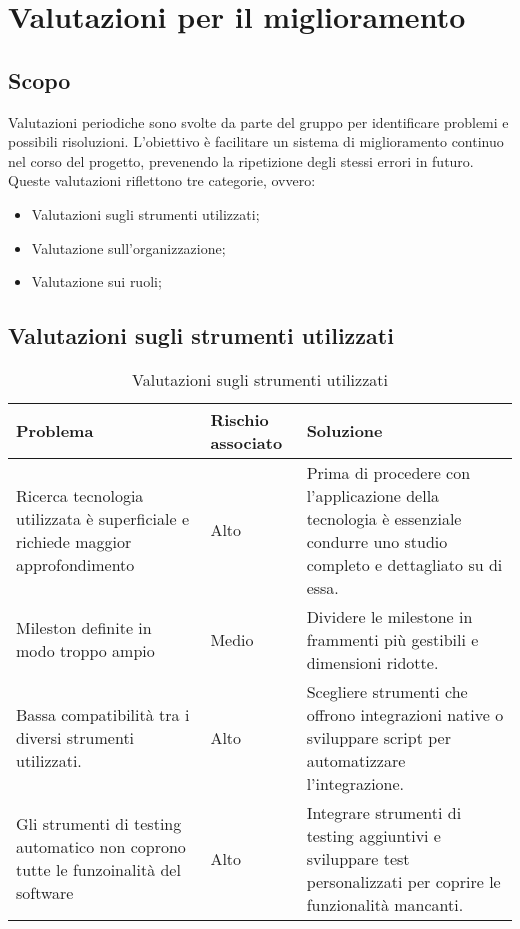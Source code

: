 

\section{Valutazioni per il miglioramento}
\label{sec:Valutazioni per il miglioramento}


\subsection{Scopo}
Valutazioni periodiche sono svolte da parte del gruppo per identificare problemi e possibili
risoluzioni. L’obiettivo è facilitare un sistema di miglioramento continuo nel corso del progetto, 
prevenendo la ripetizione degli stessi errori in futuro. 
Queste valutazioni riflettono tre categorie, ovvero:
\begin{itemize}
    \item Valutazioni sugli strumenti utilizzati;
    \item Valutazione sull'organizzazione;
    \item Valutazione sui ruoli;
\end{itemize}

\subsection{Valutazioni sugli strumenti utilizzati}
\begin{table}[h!]
    \centering
    \begin{tabularx}{\textwidth}{|X|p{}|X|}\hline
    \rowcolor[HTML]{FFD700}
    \textbf{Problema} & \textbf{Rischio associato} & \textbf{Soluzione} \\ 
    \hline
    Ricerca tecnologia utilizzata è superficiale e richiede maggior approfondimento 
    & Alto & Prima di procedere con l'applicazione della tecnologia è essenziale condurre
    uno studio completo e dettagliato su di essa. \\ 
    \hline
    Mileston definite in modo troppo ampio & Medio 
    & Dividere le milestone in frammenti più gestibili e dimensioni ridotte. \\ 
    \hline
    Bassa compatibilità tra i diversi strumenti utilizzati. & Alto &
    Scegliere strumenti che offrono integrazioni native o sviluppare script per automatizzare l'integrazione. \\ 
    \hline
    Gli strumenti di testing automatico non coprono tutte le funzoinalità del software & Alto &
    Integrare strumenti di testing aggiuntivi e sviluppare test personalizzati per coprire le funzionalità mancanti. \\
    \hline
    \end{tabularx}
    \caption{Valutazioni sugli strumenti utilizzati}
    \label{tab:valutazioni_strumenti}
\end{table}

